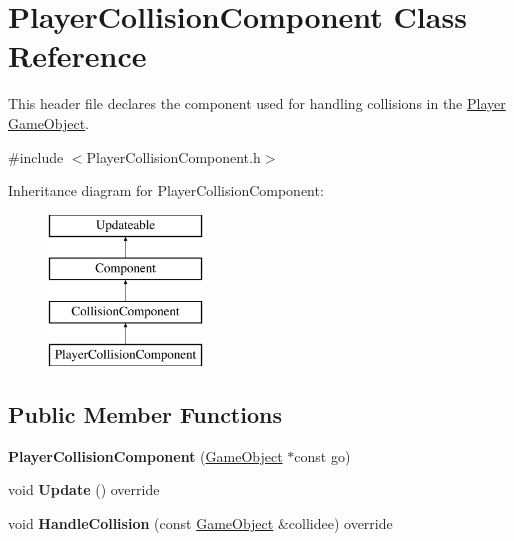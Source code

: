 \hypertarget{class_player_collision_component}{}\section{Player\+Collision\+Component Class Reference}
\label{class_player_collision_component}


This header file declares the component used for handling collisions in the \hyperlink{class_player}{Player} \hyperlink{class_game_object}{Game\+Object}.  




{\ttfamily \#include $<$Player\+Collision\+Component.\+h$>$}

Inheritance diagram for Player\+Collision\+Component\+:\begin{figure}[H]
\begin{center}
\leavevmode
\includegraphics[height=4.000000cm]{class_player_collision_component}
\end{center}
\end{figure}
\subsection*{Public Member Functions}
\begin{DoxyCompactItemize}
\item 
\hypertarget{class_player_collision_component_a007c4a2259a2de566e9fe839d314a85b}{}{\bfseries Player\+Collision\+Component} (\hyperlink{class_game_object}{Game\+Object} $\ast$const go)\label{class_player_collision_component_a007c4a2259a2de566e9fe839d314a85b}

\item 
\hypertarget{class_player_collision_component_a273de888e068ea2968bd60448de19dc0}{}void {\bfseries Update} () override\label{class_player_collision_component_a273de888e068ea2968bd60448de19dc0}

\item 
\hypertarget{class_player_collision_component_a076fe4db176e98dee1d73dc993c747fd}{}void {\bfseries Handle\+Collision} (const \hyperlink{class_game_object}{Game\+Object} \&collidee) override\label{class_player_collision_component_a076fe4db176e98dee1d73dc993c747fd}

\end{DoxyCompactItemize}
